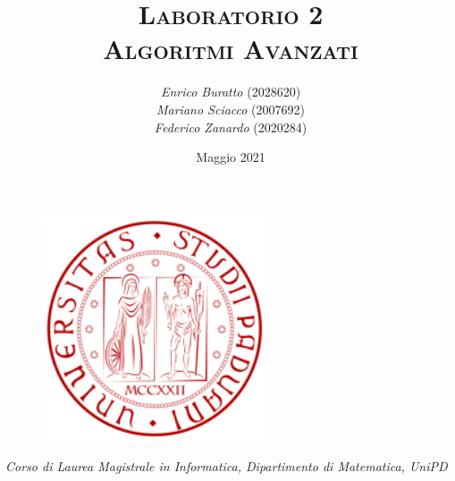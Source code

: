 \documentclass[12pt]{article}
\title{ \huge\textsc{Laboratorio 2} \\
\large\textsc{Algoritmi Avanzati}}
\author{\textit{Enrico Buratto} (2028620)\\
\textit{Mariano Sciacco} (2007692)\\
\textit{Federico Zanardo} (2020284)}
\date{\small Maggio 2021}
\renewcommand{\baselinestretch}{1.075}
\newcommand{\hr}{\par\vspace{-.1\ht\strutbox}\noindent\hrulefill\par}
\begin{document}
 

\begin{figure}[t!]
    \centering
    \includegraphics[height=18em]{res/images/logo.png}
\end{figure}

\maketitle 
\thispagestyle{empty}

\begin{center}
    \vspace{12em}
    \hr
    \textit{Corso di Laurea Magistrale in Informatica, Dipartimento di Matematica, UniPD}
\end{center}
 
\newpage
\renewcommand{\baselinestretch}{0.95}\normalsize
\tableofcontents
\renewcommand{\baselinestretch}{1.075}\normalsize

\newpage

\end{document}
